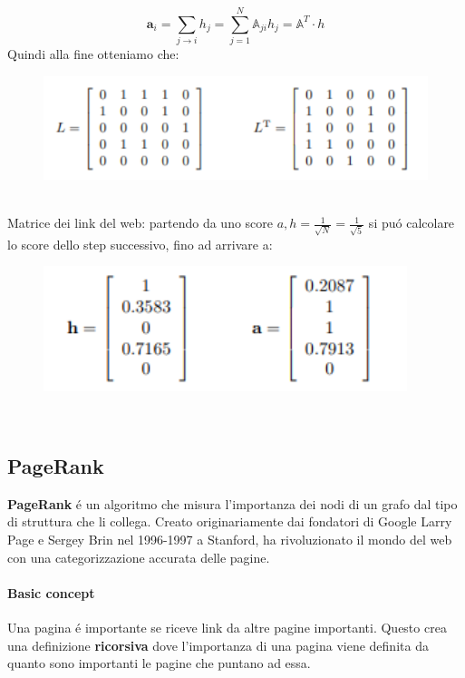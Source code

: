 \[
\textbf{a}_i = \sum_{j \rightarrow i} h_j = \sum_{j=1}^N \mathbb{A}_{ji} h_j = \mathbb{A}^T \cdot h
\]
Quindi alla fine otteniamo che:
\\
\begin{figure}[th]
    \centering
    \includegraphics[scale=0.5]{GraphImportance//img/soluzione.png}
\end{figure}
\\
Matrice dei link del web: partendo da uno score $a,h=\frac{1}{\sqrt{N}}=\frac{1}{\sqrt{5}}$ si puó calcolare lo score dello step successivo, fino ad arrivare a:
\\
\begin{figure}[th]
    \centering
    \includegraphics[scale=0.5]{GraphImportance//img/ah.png}
\end{figure}
\\

\newpage

\subsection{PageRank}
\textbf{PageRank} é un algoritmo che misura l'importanza dei nodi di un grafo dal tipo di struttura che li collega. Creato originariamente dai fondatori di Google Larry Page e Sergey Brin nel 1996-1997 a Stanford, ha rivoluzionato il mondo del web con una categorizzazione accurata delle pagine. 
\paragraph{Basic concept} Una pagina é importante se riceve link da altre pagine importanti. Questo crea una definizione \textbf{ricorsiva} dove l'importanza di una pagina viene definita da quanto sono importanti le pagine che puntano ad essa.

